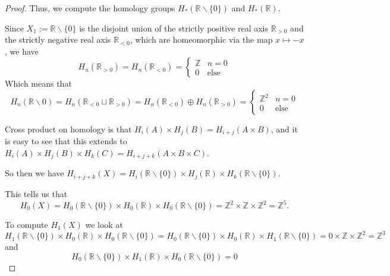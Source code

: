 \documentclass{article}
\begin{document}
\begin{enumerate}
\begin{proof}
		Thus, we compute the homology groups $H_*(\mathbb{R} \backslash \{0\})$ and $H_*(\mathbb{R})$.
		
		Since $X_1 := \mathbb{R} \backslash \{0\}$ is the disjoint union of the strictly positive real axis $\mathbb{R}_{> 0}$ and the strictly negative real axis $\mathbb{R}_{< 0}$, which are homeomorphic via the map $x \mapsto -x$,
		we have 
		\[H_n(\mathbb{R}_{> 0}) = H_n(\mathbb{R}_{< 0}) = \begin{cases} \mathbb{Z} &n=0 \\ 0 &\text{else}  \end{cases} \]
		Which means that
		\[H_n(\mathbb{R} \backslash 0) = H_n(\mathbb{R}_{< 0}\sqcup \mathbb{R}_{> 0} ) = H_n(\mathbb{R}_{< 0}) \oplus H_n(\mathbb{R}_{> 0} )  = \begin{cases} \mathbb{Z}^2 & n=0 \\ 0 & \text{else} \end{cases}\]
		
		
		Cross product on homology is that $H_{i} (A) \times H_j(B) = H_{i+j} (A\times B)$, and it is easy to see that this extends to $H_i (A) \times H_j (B) \times H_k(C) = H_{i+j+k}(A \times B \times C)$.
		
		So then we have $H_{i+j+k}(X) = H_{i}(\mathbb{R} \backslash \{0\}) \times H_{j}(\mathbb{R}) \times H_{k}(\mathbb{R} \backslash \{0\})$.
		
		This tells us that \[H_0(X) = H_0(\mathbb{R} \backslash \{0\}) \times H_0(\mathbb{R}) \times H_0(\mathbb{R} \backslash \{0\}) = \mathbb{Z}^2 \times \mathbb{Z} \times \mathbb{Z}^2 = \mathbb{Z}^5 .\]
		
		To compute $H_1(X)$ we look at 
		\[H_1(\mathbb{R} \backslash \{0\}) \times H_0(\mathbb{R}) \times H_0(\mathbb{R} \backslash \{0\}) = H_0(\mathbb{R} \backslash \{0\}) \times H_0(\mathbb{R}) \times H_1(\mathbb{R} \backslash \{0\}) = 0 \times \mathbb{Z} \times \mathbb{Z}^2 = \mathbb{Z}^3\]
		and 
		\[H_0(\mathbb{R} \backslash \{0\}) \times H_1(\mathbb{R}) \times H_0(\mathbb{R} \backslash \{0\}) = 0\]
	\end{proof}
	
\end{enumerate}
\end{document}
